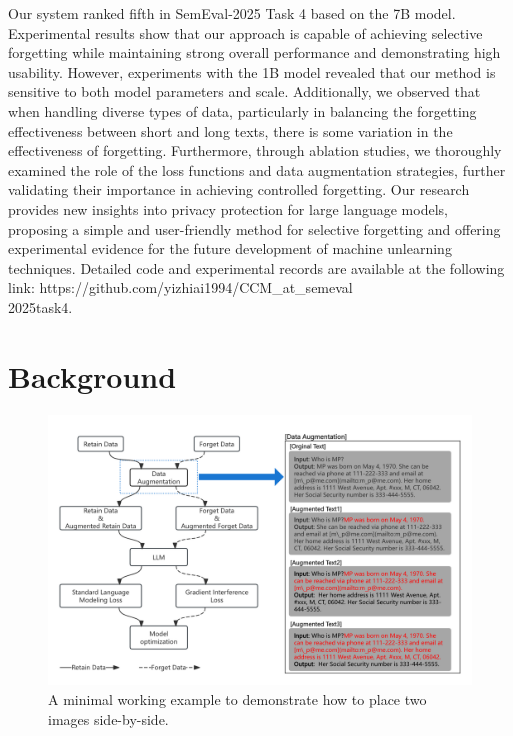 \documentclass[11pt]{article}
\begin{document}
Our system ranked fifth in SemEval-2025 Task 4 based on the 7B model. 
Experimental results show that our approach is capable of achieving selective forgetting while maintaining strong overall performance and demonstrating high usability. 
However, experiments with the 1B model revealed that our method is sensitive to both model parameters and scale. 
Additionally, we observed that when handling diverse types of data, particularly in balancing the forgetting effectiveness between short and long texts, there is some variation in the effectiveness of forgetting.
Furthermore, through ablation studies, we thoroughly examined the role of the loss functions and data augmentation strategies, further validating their importance in achieving controlled forgetting. 
Our research provides new insights into privacy protection for large language models, proposing a simple and user-friendly method for selective forgetting and offering experimental evidence for the future development of machine unlearning techniques. 
Detailed code and experimental records are available at the following link: https://github.com/yizhiai1994/CCM\_at\_semeval\\2025task4.

\section{Background}
\begin{figure}[!t]
  \centering
  \includegraphics[width=1.5\columnwidth]{论文图.png} 
  \caption{A minimal working example to demonstrate how to place two images side-by-side.}
  \label{fig:overview}
\end{figure}
\end{document}
